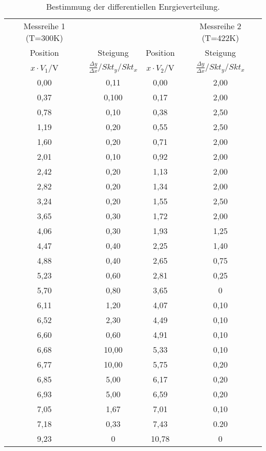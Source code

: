 \begin{table}[H]
  \centering
   \begin{tabular}{c c |c c}
    \toprule
    Messreihe 1 (T=300\;K) & & & Messreihe 2 (T=422\;K)\\
    Position & Steigung & Position & Steigung\\
    $x \cdot V_1$/\;V & $\frac{\Delta y}{\Delta x}/ Skt_{y}/Skt_{x}$ &
    $x \cdot V_2$/\;V & $\frac{\Delta y}{\Delta x}/ Skt_{y}/Skt_{x}$\\
    \midrule
    0,00 & 0,11 & 0,00 & 2,00\\
    0,37 & 0,100 & 0,17 & 2,00\\
    0,78 & 0,10 & 0,38 & 2,50\\
    1,19 & 0,20 & 0,55 & 2,50\\
    1,60 &  0,20 & 0,71 & 2,00\\
    2,01 & 0,10 & 0,92 & 2,00\\
    2,42 & 0,20 & 1,13 & 2,00\\
    2,82 & 0,20 & 1,34 & 2,00\\
    3,24 & 0,20 & 1,55 & 2,50\\
    3,65 & 0,30 & 1,72 & 2,00\\
    4,06 & 0,30 & 1,93 & 1,25\\
    4,47 & 0,40 & 2,25 & 1,40\\
    4,88 & 0,40 & 2,65 & 0,75\\
    5,23 & 0,60 & 2,81 & 0,25\\
    5,70 & 0,80 & 3,65 & 0\\
    6,11 & 1,20 & 4,07 & 0,10\\
    6,52 & 2,30 & 4,49 & 0,10\\
    6,60 & 0,60  & 4,91 & 0,10\\
    6,68 & 10,00 & 5,33 & 0,10\\
    6,77 & 10,00 & 5,75 & 0,20\\
    6,85 & 5,00 & 6,17 & 0,20\\
    6,93 & 5,00 & 6,59 & 0,20\\
    7,05 & 1,67 & 7,01 & 0,10\\
    7,18 & 0,33 & 7,43 & 0.20\\
    9,23 & 0 & 10,78 & 0\\
    \bottomrule
  \end{tabular}
  \caption{Bestimmung der differentiellen Enrgieverteilung.}
  \label{tab:tab3}
\end{table}
